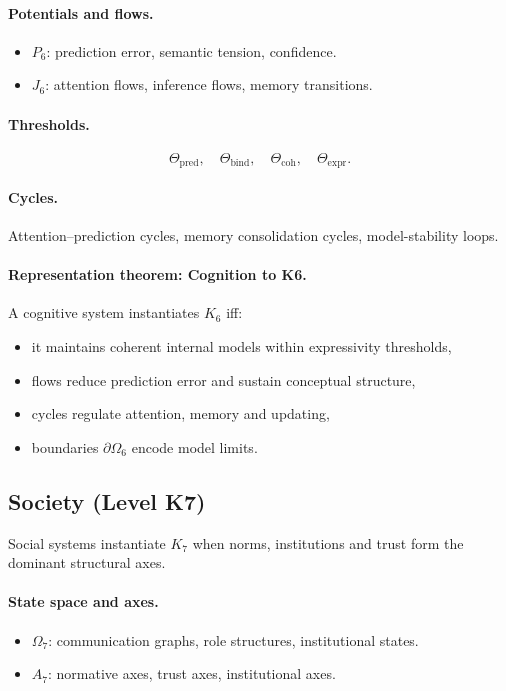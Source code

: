 \paragraph{Potentials and flows.}
\begin{itemize}
  \item \(P_6\): prediction error, semantic tension, confidence.
  \item \(J_6\): attention flows, inference flows, memory transitions.
\end{itemize}

\paragraph{Thresholds.}
\[
  \Theta_{\mathrm{pred}},\quad
  \Theta_{\mathrm{bind}},\quad
  \Theta_{\mathrm{coh}},\quad
  \Theta_{\mathrm{expr}}.
\]

\paragraph{Cycles.}
Attention–prediction cycles, memory consolidation cycles, model-stability
loops.

\paragraph{Representation theorem: Cognition to K6.}
A cognitive system instantiates \(K_6\) iff:
\begin{itemize}
  \item it maintains coherent internal models within expressivity thresholds,
  \item flows reduce prediction error and sustain conceptual structure,
  \item cycles regulate attention, memory and updating,
  \item boundaries \(\partial\Omega_6\) encode model limits.
\end{itemize}

\subsection{Society (Level K7)}

Social systems instantiate \(K_7\) when norms, institutions and trust form the
dominant structural axes.

\paragraph{State space and axes.}
\begin{itemize}
  \item \(\Omega_7\): communication graphs, role structures, institutional
        states.
  \item \(A_7\): normative axes, trust axes, institutional axes.
\end{itemize}

